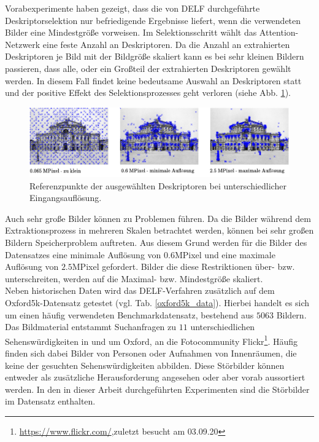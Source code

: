 Vorabexperimente haben gezeigt, dass die von DELF durchgeführte Deskriptorselektion nur befriedigende Ergebnisse liefert, wenn die verwendeten Bilder eine Mindestgröße vorweisen. Im Selektionsschritt wählt das Attention-Netzwerk eine feste Anzahl an Deskriptoren. Da die Anzahl an extrahierten Deskriptoren je Bild mit der Bildgröße skaliert kann es bei sehr kleinen Bildern passieren, dass alle, oder ein Großteil der extrahierten Deskriptoren gewählt werden. In diesem Fall findet keine bedeutsame Auswahl an Deskriptoren statt und der positive Effekt des Selektionsprozesses geht verloren (siehe Abb. \ref{small_img}).
\begin{figure}[h]
\includegraphics[scale=0.955]{scale_descriptor_selection.pdf}
\caption{Referenzpunkte der ausgewählten Deskriptoren bei unterschiedlicher Eingangsauflösung.}
\label{small_img}
\end{figure}
Auch sehr große Bilder können zu Problemen führen. Da die Bilder während dem Extraktionsprozess in mehreren Skalen betrachtet werden, können bei sehr großen Bildern Speicherproblem auftreten. Aus diesem Grund werden für die Bilder des Datensatzes eine minimale Auflösung von $0.6$MPixel und eine maximale Auflösung von $2.5$MPixel gefordert. Bilder die diese Restriktionen über- bzw. unterschreiten, werden auf die Maximal- bzw. Mindestgröße skaliert.\\
Neben historischen Daten wird das DELF-Verfahren zusätzlich auf dem Oxford5k-Datensatz \cite{oxford5k} getestet (vgl. Tab. \ref{oxford5k_data}). Hierbei handelt es sich um einen häufig verwendeten Benchmarkdatensatz, bestehend aus $5063$ Bildern. Das Bildmaterial entstammt Suchanfragen zu $11$ unterschiedlichen Sehenswürdigkeiten in und um Oxford, an die Fotocommunity Flickr\footnote{\url{https://www.flickr.com/},zuletzt besucht am 03.09.20}. Häufig finden sich dabei Bilder von Personen oder Aufnahmen von Innenräumen, die keine der gesuchten Sehenswürdigkeiten abbilden. Diese Störbilder können entweder als zusätzliche Herausforderung angesehen oder aber vorab aussortiert werden. In den in dieser Arbeit durchgeführten Experimenten sind die Störbilder im Datensatz enthalten. 
